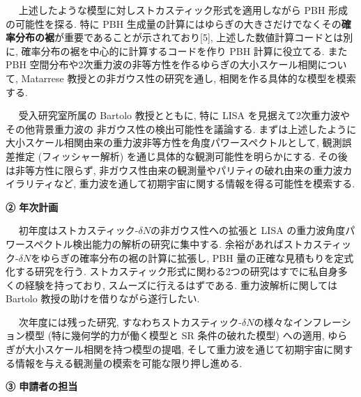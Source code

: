 \documentclass[11pt,a4paper,uplatex,twoside,dvipdfmx]{ujarticle} 	%
\renewcommand{\emph}[1]{{\sffamily\gtfamily\bfseries #1}}
\newcommand{\subject}[1]{\noindent{\sffamily\gtfamily\bfseries #1}~~}
\newcommand{\研究課題名}{\mgfamily ストカスティック形式、原始ブラックホール、重力波観測から迫るインフレーション}
\newcommand{\研究機関名}{\mgfamily 名古屋大学}
\newcommand{\申請者氏名}{\mgfamily 多田 祐一郎}
\newcommand{\研究代表者氏名}{\申請者氏名}
\newcommand{\研究期間の最終元号年度}{34}	%
\begin{document}
{	
	\vspace{3pt}
	\subject{2. PBH}
	上述したような模型に対しストカスティック形式を適用しながら PBH 形成の可能性を探る.
	特に PBH 生成量の計算にはゆらぎの大きさだけでなくその\emph{確率分布の裾}が重要であることが示されており[5],
	上述した数値計算コードとは別に, 確率分布の裾を中心的に計算するコードを作り PBH 計算に役立てる.
	また PBH 空間分布や2次重力波の非等方性を作るゆらぎの大小スケール相関について,
	Matarrese 教授との非ガウス性の研究を通し, 相関を作る具体的な模型を模索する.
	
	
	\vspace{3pt}
	\subject{3. 重力波}
	受入研究室所属の Bartolo 教授とともに, 特に LISA を見据えて2次重力波やその他背景重力波の
	非ガウス性の検出可能性を議論する.
	まずは上述したように大小スケール相関由来の重力波非等方性を角度パワースペクトルとして,
	観測誤差推定 (フィッシャー解析) を通じ具体的な観測可能性を明らかにする.
	その後は非等方性に限らず, 非ガウス性由来の観測量やパリティの破れ由来の重力波カイラリティなど,
	重力波を通して初期宇宙に関する情報を得る可能性を模索する.
	
	
	
	
	\begin{mdframed}[roundcorner=0.5zw,
	innertopmargin=0.8zw,innerbottommargin=0.8zw,
	linecolor=black!50,linewidth=0.2zw,
	backgroundcolor=black!10]
	{\bfseries\gtfamily\sffamily\large ② 年次計画}
	\end{mdframed}
	
	\vspace{-10pt}
	\subject{1年目}
	初年度はストカスティック-$\delta N$の非ガウス性への拡張と LISA の重力波角度パワースペクトル検出能力の解析の研究に集中する.
	余裕があればストカスティック-$\delta N$をゆらぎの確率分布の裾の計算に拡張し, PBH 量の正確な見積もりを定式化する研究を行う.
	ストカスティック形式に関わる2つの研究はすでに私自身多くの経験を持っており, スムーズに行えるはずである.
	重力波解析に関しては Bartolo 教授の助けを借りながら遂行したい.
	
	
	\vspace{3pt}
	\subject{2年目}
	次年度には残った研究, すなわちストカスティック-$\delta N$の様々なインフレーション模型 (特に幾何学的力が働く模型と SR 条件の破れた模型) への適用,
	ゆらぎが大小スケール相関を持つ模型の提唱, そして重力波を通じて初期宇宙に関する情報を与える観測量の模索を可能な限り押し進める.
	
	
	\begin{mdframed}[roundcorner=0.5zw,
	innertopmargin=0.8zw,innerbottommargin=0.8zw,
	linecolor=black!50,linewidth=0.2zw,
	backgroundcolor=black!10]
	{\bfseries\gtfamily\sffamily\large ③ 申請者の担当}
	\end{mdframed}
	
}
\end{document}

